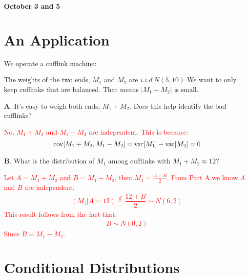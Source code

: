 \documentclass[../../../Master/AppliedStochastics.tex]{subfiles}
\author{Chandler}  %
\date{October 3 and 5}    %
\begin{document}
%


\makelecture %
\textbf{October 3 and 5}
\section{An Application}

We operate a cufflink machine:

\begin{center}
\end{center}

The weights of the two ends, $M_1$ and $M_2$ are $i.i.d\ N(5,10)$ 
We want to only keep cufflinks that are balanced. 
That means $\lvert M_{1} - M_{2} \rvert$ is small.

\textbf{A}. It's easy to weigh both ends, $M_{1}+M_{2}$. 
Does this help identify the bad cufflinks?

\textcolor{Red}{No. $M_{1}+M_{2}$ and $M_{1}-M_{2}$ are independent. 
	This is because: 
	$$\begin{aligned}
	\operatorname{cov} [M_{1}+M_{2}, M_{1}-M_{2}] = \operatorname{var} [M_{1}]-\operatorname{var} [M_{2}] = 0
	\end{aligned}$$ }

\textbf{B}. What is the distribution of $M_{1}$ among cufflinks with $M_{1}+M_{2}\approx 12$? 

\textcolor{Red}{Let $A=M_{1}+M_{2}$ and $B=M_{1}-M_{2}$, then $M_{1}=\frac{A+B}{2}$. 
	From Part A we know $A$ and $B$ are independent. 
	$$\begin{aligned}
	(M_{1}\vert A=12) \stackrel{d}{=} \dfrac{12 + B}{2} \sim N(6,2)
	\end{aligned}$$
	This result follows from the fact that: 
	$$\begin{aligned}
	B \sim N(0,2)
	\end{aligned}$$ 
	Since $B=M_{1}-M_{2}$.
}


\section{Conditional Distributions}
\end{document}
